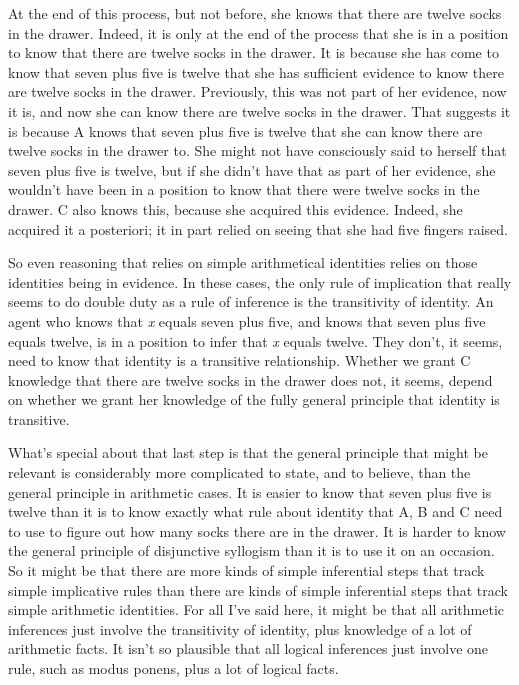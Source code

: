 \documentclass[
  10pt,
  letterpaper,
  twoside]{scrbook}
\begin{document}
At the end of this process, but not before, she knows that there are
twelve socks in the drawer. Indeed, it is only at the end of the process
that she is in a position to know that there are twelve socks in the
drawer. It is because she has come to know that seven plus five is
twelve that she has sufficient evidence to know there are twelve socks
in the drawer. Previously, this was not part of her evidence, now it is,
and now she can know there are twelve socks in the drawer. That suggests
it is because A knows that seven plus five is twelve that she can know
there are twelve socks in the drawer to. She might not have consciously
said to herself that seven plus five is twelve, but if she didn't have
that as part of her evidence, she wouldn't have been in a position to
know that there were twelve socks in the drawer. C also knows this,
because she acquired this evidence. Indeed, she acquired it a
posteriori; it in part relied on seeing that she had five fingers
raised.

So even reasoning that relies on simple arithmetical identities relies
on those identities being in evidence. In these cases, the only rule of
implication that really seems to do double duty as a rule of inference
is the transitivity of identity. An agent who knows that \emph{x} equals
seven plus five, and knows that seven plus five equals twelve, is in a
position to infer that \emph{x} equals twelve. They don't, it seems,
need to know that identity is a transitive relationship. Whether we
grant C knowledge that there are twelve socks in the drawer does not, it
seems, depend on whether we grant her knowledge of the fully general
principle that identity is transitive.

What's special about that last step is that the general principle that
might be relevant is considerably more complicated to state, and to
believe, than the general principle in arithmetic cases. It is easier to
know that seven plus five is twelve than it is to know exactly what rule
about identity that A, B and C need to use to figure out how many socks
there are in the drawer. It is harder to know the general principle of
disjunctive syllogism than it is to use it on an occasion. So it might
be that there are more kinds of simple inferential steps that track
simple implicative rules than there are kinds of simple inferential
steps that track simple arithmetic identities. For all I've said here,
it might be that all arithmetic inferences just involve the transitivity
of identity, plus knowledge of a lot of arithmetic facts. It isn't so
plausible that all logical inferences just involve one rule, such as
modus ponens, plus a lot of logical facts.
\end{document}
